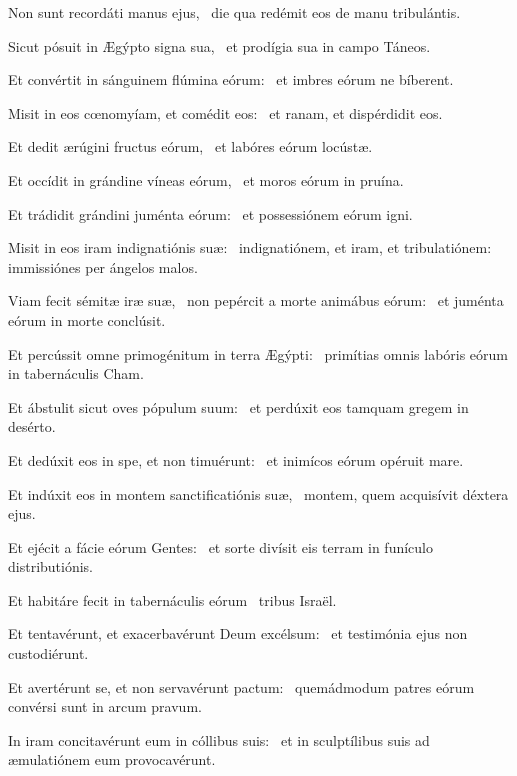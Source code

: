 
\item Non sunt recordáti manus ejus,~\psstar{} die qua redémit eos de manu tribulántis.

\item Sicut pósuit in Ægýpto signa sua,~\psstar{} et prodígia sua in campo Táneos.

\item Et convértit in sánguinem flúmina eórum:~\psstar{} et imbres eórum ne bíberent.

\item Misit in eos cœnomyíam, et comédit eos:~\psstar{} et ranam, et dispérdidit eos.

\item Et dedit ærúgini fructus eórum,~\psstar{} et labóres eórum locústæ.

\item Et occídit in grándine víneas eórum,~\psstar{} et moros eórum in pruína.

\item Et trádidit grándini juménta eórum:~\psstar{} et possessiónem eórum igni.

\item Misit in eos iram indignatiónis suæ:~\psstar{} indignatiónem, et iram, et tribulatiónem: immissiónes per ángelos malos.

\item Viam fecit sémitæ iræ suæ,~\pscross{} non pepércit a morte animábus eórum:~\psstar{} et juménta eórum in morte conclúsit.

\item Et percússit omne primogénitum in terra Ægýpti:~\psstar{} primítias omnis labóris eórum in tabernáculis Cham.

\item Et ábstulit sicut oves pópulum suum:~\psstar{} et perdúxit eos tamquam gregem in desérto.

\item Et dedúxit eos in spe, et non timuérunt:~\psstar{} et inimícos eórum opéruit mare.

\item Et indúxit eos in montem sanctificatiónis suæ,~\psstar{} montem, quem acquisívit déxtera ejus.

\item Et ejécit a fácie eórum Gentes:~\psstar{} et sorte divísit eis terram in funículo distributiónis.

\item Et habitáre fecit in tabernáculis eórum~\psstar{} tribus Israël.

\item Et tentavérunt, et exacerbavérunt Deum excélsum:~\psstar{} et testimónia ejus non custodiérunt.

\item Et avertérunt se, et non servavérunt pactum:~\psstar{} quemádmodum patres eórum convérsi sunt in arcum pravum.

\item In iram concitavérunt eum in cóllibus suis:~\psstar{} et in sculptílibus suis ad æmulatiónem eum provocavérunt.
